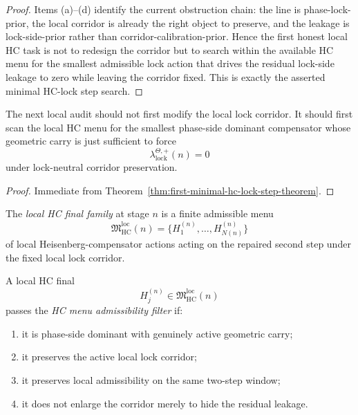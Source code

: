 \begin{proof}
Items (a)--(d) identify the current obstruction chain: the line is phase-lock-prior, the local corridor is already the right object to preserve, and the leakage is lock-side-prior rather than corridor-calibration-prior. Hence the first honest local HC task is not to redesign the corridor but to search within the available HC menu for the smallest admissible lock action that drives the residual lock-side leakage to zero while leaving the corridor fixed. This is exactly the asserted minimal HC-lock step search.
\end{proof}

\begin{corollary}
\label{cor:current-minimal-hc-working-rule}
The next local audit should not first modify the local lock corridor. It should first scan the local HC menu for the smallest phase-side dominant compensator whose geometric carry is just sufficient to force
\[
 \lambda_{\mathrm{lock}}^{\Theta,+}(n)=0
\]
under lock-neutral corridor preservation.
\end{corollary}

\begin{proof}
Immediate from Theorem~\ref{thm:first-minimal-hc-lock-step-theorem}.
\end{proof}



\begin{definition}
\label{def:local-hc-final-family}
The \emph{local HC final family} at stage $n$ is a finite admissible menu
\[
 \mathfrak M_{\mathrm{HC}}^{\mathrm{loc}}(n)
 =
 \{H_1^{(n)},\dots,H_{N(n)}^{(n)}\}
\]
of local Heisenberg-compensator actions acting on the repaired second step under the fixed local lock corridor.
\end{definition}

\begin{definition}
\label{def:hc-menu-admissibility-filter}
A local HC final
\[
 H_j^{(n)}\in \mathfrak M_{\mathrm{HC}}^{\mathrm{loc}}(n)
\]
passes the \emph{HC menu admissibility filter} if:
\begin{enumerate}[leftmargin=2em,label=(\alph*)]
 \item it is phase-side dominant with genuinely active geometric carry;
 \item it preserves the active local lock corridor;
 \item it preserves local admissibility on the same two-step window;
 \item it does not enlarge the corridor merely to hide the residual leakage.
\end{enumerate}
\end{definition}

